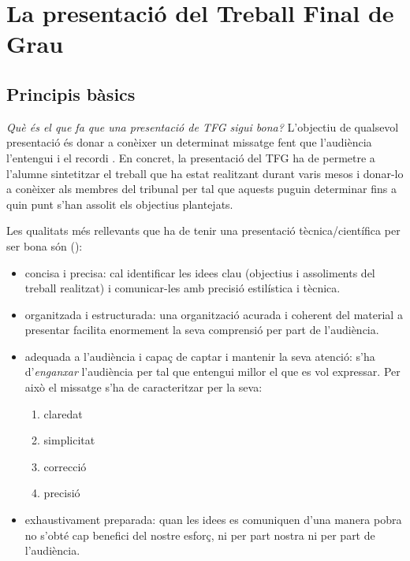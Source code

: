 
\chapter{La presentació del Treball Final de Grau}\label{presentació}

\section{Principis bàsics}
\emph{Què és el que fa que una presentació de \ac{TFG} sigui bona?} L'objectiu de qualsevol presentació és donar a conèixer un determinat missatge fent que l'audiència l'entengui i el recordi \cite{Blair91,Padgett08}. En concret, la presentació del \ac{TFG} ha de permetre a l'alumne sintetitzar el treball que ha estat realitzant durant varis mesos i donar-lo a conèixer als membres del tribunal per tal que aquests puguin determinar fins a quin punt s'han assolit els objectius plantejats.

Les qualitats més rellevants que ha de tenir una presentació tècnica/científica per ser bona són (\cite{Blair91,Padgett08,Arcy88,Rice04}):
\begin{itemize}\tightlist
  \item concisa i precisa: cal identificar les idees clau (objectius i assoliments del treball realitzat) i comunicar-les amb precisió estilística i tècnica.
  \item organitzada i estructurada: una organització acurada i coherent del material a presentar facilita enormement la seva comprensió per part de l'audiència.
  \item adequada a l'audiència i capaç de captar i mantenir la seva atenció: s'ha d'\emph{en\-gan\-xar} l'audiència per tal que entengui millor el que es vol expressar. Per això el missatge s'ha de caracteritzar per la seva:
      \begin{enumerate}\tightlist
        \item claredat
        \item simplicitat
        \item correcció
        \item precisió
      \end{enumerate}
  \item exhaustivament preparada: quan les idees es comuniquen d'una manera pobra no s'obté cap benefici del nostre esforç, ni per part nostra ni per part de l'audiència.
\end{itemize}


